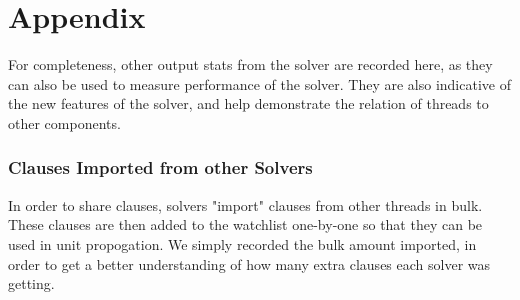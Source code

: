 \documentclass[11pt]{extarticle}
\begin{document}
\section*{Appendix}
For completeness, other output stats from the solver are recorded here, as they can also be used
to measure performance of the solver. They are also indicative of the new features of the
solver, and help demonstrate the relation of threads to other components.

\subsubsection*{Clauses Imported from other Solvers}

In order to share clauses, solvers "import" clauses from other threads in bulk. These clauses
are then added to the watchlist one-by-one so that they can be used in unit propogation.
We simply recorded the bulk amount imported, in order to get a better understanding of how many
extra clauses each solver was getting.
\end{document}
